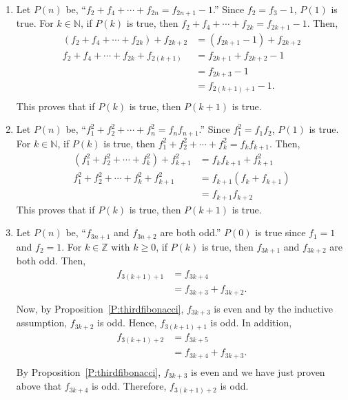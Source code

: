 \begin{enumerate}
\begin{enumerate}
\item Let $P \left( n \right)$ be, ``$f_2  + f_4  +  \cdots  + f_{2n}  = f_{2n + 1}  - 1$.''  Since $f_2 = f_3 - 1$, $P \left( 1 \right)$ is true.  For $k \in \mathbb{N}$, if 
$P \left( k \right)$ is true, then $f_2  + f_4  +  \cdots  + f_{2k}  = f_{2k + 1}  - 1$.  Then,
\[
\begin{aligned}
\left( f_2  + f_4  +  \cdots  + f_{2k} \right) + f_{2k+2}  &= 
\left( f_{2k+1} - 1 \right) + f_{2k+2} \\
f_2  + f_4  +  \cdots  + f_{2k} + f_{2 \left( k+1 \right)}  &= f_{2k+1} + f_{2k+2} -1 \\
                                                            &= f_{2k+3} - 1 \\
                                                        &= f_{2 \left( k + 1 \right) + 1} - 1. \\          
\end{aligned}
\]
This proves that if $P \left( k \right)$ is true, then $P \left( k + 1\right)$ is true.

\item Let $P \left( n \right)$ be, ``$f_1^2  + f_2^2  +  \cdots  + f_n^2  = f_n f_{n + 1} $.''  Since $f_1^2 = f_1 f_2$, $P \left( 1 \right)$ is true.  For $k \in \mathbb{N}$, if 
$P \left( k \right)$ is true, then $f_1^2  + f_2^2  +  \cdots  + f_k^2  = f_k f_{k + 1} $.  Then,
\[
\begin{aligned}
\left( f_1^2  + f_2^2  +  \cdots  + f_k^2  \right) + f_{k+1}^2  &= 
f_k f_{k + 1} + f_{k+1}^2 \\
f_1^2  + f_2^2  +  \cdots  + f_k^2 + f_{k+1}^2  &= f_{k+1} \left( f_k + f_{k+1} \right) \\
                                                &= f_{k+1} f_{k+2}         
\end{aligned}
\]
This proves that if $P \left( k \right)$ is true, then $P \left( k + 1\right)$ is true.

\item Let $P \left( n \right)$ be, ``$f_{3n+1}$ and $f_{3n+2}$ are both odd.''  
$P \left( 0 \right)$ is true since $f_1 = 1$ and $f_2 = 1$.  For $k \in \mathbb{Z}$ with 
$k \geq 0$, if $P \left( k \right)$ is true, then $f_{3k+1}$ and $f_{3k+2}$ are both odd.  Then,
\[
\begin{aligned}
f_{3 \left( k + 1 \right) + 1} &= f_{3k + 4} \\
                               &= f_{3k + 3} + f_{3k + 2}. \\
\end{aligned}
\]
Now, by Proposition~\ref{P:thirdfibonacci}, $f_{3k+3}$ is even and by the inductive assumption, 
$f_{3k+2}$ is odd.  Hence, $f_{3 \left( k + 1 \right) + 1}$ is odd.  In addition,
\[
\begin{aligned}
f_{3 \left( k + 1 \right) + 2} &= f_{3k + 5} \\
                               &= f_{3k + 4} + f_{3k + 3}. \\
\end{aligned}
\]
By Proposition~\ref{P:thirdfibonacci}, $f_{3k+3}$ is even and we have just proven above that 
$f_{3k+4}$ is odd.  Therefore, $f_{3 \left( k + 1 \right) + 2}$ is odd.


\end{enumerate}
\end{enumerate}
